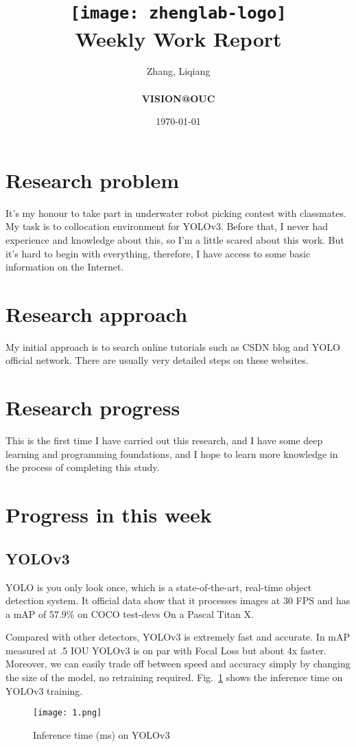 \documentclass[a4paper]{article}
\title{
    \vspace*{1in}
    \texttt{[image: zhenglab-logo]} \\
    \vspace*{1.2in}
    \textbf{\huge Weekly Work Report}
    \vspace{0.2in}
}
\author{Zhang, Liqiang \\
    \vspace*{0.5in} \\
    \textbf{VISION@OUC} \\
    \vspace*{1in}
}
\date{\today}
\begin{document}
\maketitle
\setcounter{page}{0}
\thispagestyle{empty}
\newpage
\section{Research problem}
It's my honour to take part in underwater robot picking contest with classmates. My task is to collocation environment for YOLOv3. Before that, I never had experience and knowledge about this, so I'm a little scared about this work. But it's hard to begin with everything, therefore, I have access to some basic information on the Internet. 
\section{Research approach}
My initial approach is to search online tutorials such as CSDN blog and YOLO official network. There are usually very detailed steps on these websites.
\section{Research progress}
This is the first time I have carried out this research, and I have some deep learning and programming foundations, and I hope to learn more knowledge in the process of completing this study.
\section{Progress in this week}
\subsection{YOLOv3}
\par
YOLO is you only look once, which is a state-of-the-art, real-time object detection system. It official data show that it processes images at 30 FPS and has a mAP of 57.9\% on COCO test-devs On a Pascal Titan X. 
\par
Compared with other detectors, YOLOv3 is extremely fast and accurate. In mAP measured at .5 IOU YOLOv3 is on par with Focal Loss but about 4x faster. Moreover, we can easily trade off between speed and accuracy simply by changing the size of the model, no retraining required. Fig.~\ref{1} shows the inference time on YOLOv3 training.
\begin{figure}[h]
\begin{center}
  \texttt{[image: 1.png]}\\
  \caption{Inference time (ms) on YOLOv3}\label{1}
\end{center}
\end{figure}
\end{document}
